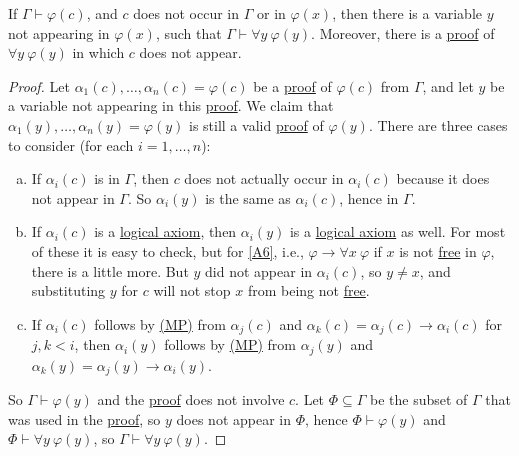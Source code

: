 \begin{lemma}\label{lma:lec8}
	If \(\Gamma \vdash \varphi (c)\), and \(c\) does not occur in \(\Gamma \) or in \(\varphi (x)\), then there is a variable \(y\) not appearing in \(\varphi (x)\), such that \(\Gamma \vdash \forall y\ \varphi (y)\). Moreover, there is a \hyperref[def:proof]{proof} of \(\forall y\ \varphi (y)\) in which \(c\) does not appear.
\end{lemma}
\begin{proof}
	Let \(\alpha _1(c), \dots , \alpha _n(c) = \varphi (c)\) be a \hyperref[def:proof]{proof} of \(\varphi (c)\) from \(\Gamma \), and let \(y\) be a variable not appearing in this \hyperref[def:proof]{proof}. We claim that \(\alpha _1(y), \dots , \alpha _n(y) = \varphi (y)\) is still a valid \hyperref[def:proof]{proof} of \(\varphi (y)\). There are three cases to consider (for each \(i = 1, \dots , n\)):
	\begin{enumerate}[(a)]
		\item If \(\alpha _i(c)\) is in \(\Gamma \), then \(c\) does not actually occur in \(\alpha _i(c)\) because it does not appear in \(\Gamma \). So \(\alpha _i(y)\) is the same as \(\alpha _i(c)\), hence in \(\Gamma \).
		\item If \(\alpha _i(c)\) is a \hyperref[def:logical-axioms]{logical axiom}, then \(\alpha _i(y)\) is a \hyperref[def:logical-axioms]{logical axiom} as well. For most of these it is easy to check, but for \autoref{A6}, i.e., \(\varphi \to \forall x\ \varphi \) if \(x\) is not \hyperref[def:free-variable]{free} in \(\varphi \), there is a little more. But \(y\) did not appear in \(\alpha _i(c)\), so \(y \neq x\), and substituting \(y\) for \(c\) will not stop \(x\) from being not \hyperref[def:free-variable]{free}.
		\item If \(\alpha _i(c)\) follows by \hyperref[def:rule-of-inference]{(MP)} from \(\alpha _j(c)\) and \(\alpha _k(c) = \alpha _j(c) \to  \alpha _i(c)\) for \(j, k < i\), then \(\alpha _i(y)\) follows by \hyperref[def:rule-of-inference]{(MP)} from \(\alpha _j(y)\) and \(\alpha _k(y) = \alpha _j(y) \to  \alpha _i(y)\).
	\end{enumerate}
	So \(\Gamma \vdash \varphi (y)\) and the \hyperref[def:proof]{proof} does not involve \(c\). Let \(\Phi \subseteq \Gamma \) be the subset of \(\Gamma \) that was used in the \hyperref[def:proof]{proof}, so \(y\) does not appear in \(\Phi \), hence \(\Phi \vdash \varphi (y)\) and \(\Phi \vdash \forall y\ \varphi (y)\), so \(\Gamma \vdash \forall y\ \varphi (y)\).
\end{proof}

